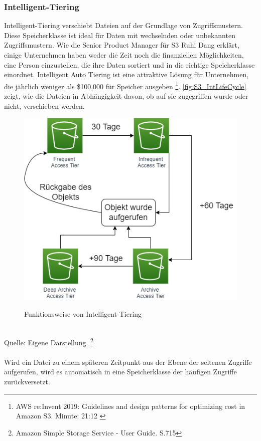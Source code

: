 \subsubsection{Intelligent-Tiering}
Intelligent-Tiering verschiebt Dateien auf der Grundlage von Zugriffsmustern. Diese Speicherklasse ist ideal für Daten mit wechselnden oder unbekannten Zugriffsmustern. 
Wie die Senior Product Manager für S3 Ruhi Dang erklärt, einige Unternehmen haben weder die Zeit noch die finanziellen Möglichkeiten, eine Person einzustellen, die ihre Daten sortiert und in die richtige Speicherklasse einordnet. Intelligent Auto Tiering ist eine attraktive Lösung für Unternehmen, die jährlich weniger als \$100,000 für Speicher ausgeben \footnote{AWS re:Invent 2019: Guidelines and design patterns for optimizing cost in Amazon S3. Minute: 21:12 \cite{AMZ16}}.
\autoref{fig:S3_IntLifeCycle} zeigt, wie die Dateien in Abhängigkeit davon, ob auf sie zugegriffen wurde oder nicht, verschieben werden. 
\begin{figure}[h!]
  \centering
  \includegraphics[scale=0.7]{sources/S3_IntLifeCycle}
  \caption[Funktionsweise von Intelligent-Tiering]{}\label{fig:S3_IntLifeCycle} Funktionsweise von Intelligent-Tiering
\end{figure}\\
Quelle: Eigene Darstellung. \footnote{Amazon Simple Storage Service - User Guide. S.715\cite{AMZ18}}
\\\\
Wird ein Datei zu einem späteren Zeitpunkt aus der Ebene der seltenen Zugriffe aufgerufen, wird es automatisch in eine Speicherklasse der häufigen Zugriffe zurückversetzt.















